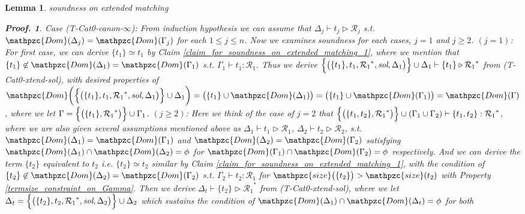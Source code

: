 \documentclass[12pt]{article}
\newtheorem{Lemma}{Lemma}[section]
\newtheorem{Proof}{Proof.}
\begin{document}
\begin{Lemma}{soundness on extended matching}
\begin{Proof}
    Case (T-Cat0-canon-$\infty$): From induction hypothesis we can assume
    that $\Delta_j \vdash t_j \triangleright \mathcal{R}_j$ s.t.
    $\mathpzc{Dom}(\Delta_j) = \mathpzc{Dom}(\Gamma_j)$ for each
    $1 \le j \le n$. Now we examines soundness for each cases,
    $j = 1$ and $j \ge 2$.
    $(j = 1)$: For first case, we can derive $\{t_1\} \simeq t_1$ by
    Claim \ref{claim_for_soundness_on_extended_matching_1}, where
    we mention that
    $\{t_1\} \not\in \mathpzc{Dom}(\Delta_1) = \mathpzc{Dom}(\Gamma_1)$
    s.t. $\Gamma_1 \vdash t_1 : \mathcal{R}_1$. Thus we derive    
    $\Bigl\{\bigl(\{t_1\}, t_1, {\mathcal{R}_1}^*, \text{\it sol}, \Delta_1
    \bigr) \Bigr\} \cup \Delta_1 \vdash \{t_1\}
    \triangleright {\mathcal{R}_1}^*$ from (T-Cat0-xtend-sol),
    with desired properties of
    $\mathpzc{Dom}\biggl(\Bigl\{\bigl(\{t_1\}, t_1, {\mathcal{R}_1}^*,
    \text{\it sol}, \Delta_1 \bigr) \Bigr\} \cup \Delta_1 \biggr) =
    \bigl(\{t_1\} \cup \mathpzc{Dom}(\Delta_1) \bigr) =
    \bigl(\{t_1\} \cup \mathpzc{Dom}(\Gamma_1) \bigr) =
    \mathpzc{Dom}(\Gamma)$, where we let
    $\Gamma = \Bigl\{\bigl(\{t_1\}, {\mathcal{R}_1}^* \bigr) \Bigr\} \cup
    \Gamma_1$.
    $(j \ge 2)$: Here we think of the case of $j = 2$ that
    $\Bigl\{\bigl(\{t_1, t_2\}, {\mathcal{R}_1}^*\bigr) \Bigr\} \cup
    (\Gamma_1 \cup \Gamma_2) \vdash \{t_1, t_2\} : {\mathcal{R}_1}^*$,
    where we are also given several assumptions mentioned above as
    $\Delta_1 \vdash t_1 \triangleright \mathcal{R}_1$,
    $\Delta_2 \vdash t_2 \triangleright \mathcal{R}_2$, s.t.
    $\mathpzc{Dom}(\Delta_1) = \mathpzc{Dom}(\Gamma_1)$ and
    $\mathpzc{Dom}(\Delta_2) = \mathpzc{Dom}(\Gamma_2)$ satisfying
    $\mathpzc{Dom}(\Delta_1) \cap \mathpzc{Dom}(\Delta_2) = \phi$ for
    $\mathpzc{Dom}(\Gamma_1) \cap \mathpzc{Dom}(\Gamma_2) = \phi$
    respectively.
    And we can derive the term $\{t_2\}$ equivalent to $t_2$ i.e.
    $\{t_2\} \simeq t_2$ similar by
    Claim \ref{claim_for_soundness_on_extended_matching_1}, with
    the condition of
    $\{t_2\} \not\in \mathpzc{Dom}(\Delta_2) = \mathpzc{Dom}(\Gamma_2)$
    s.t. $\Gamma_2 \vdash t_2 : \mathcal{R}_1$ for
    $\mathpzc{size}\bigl(\{t_2\} \bigr) > \mathpzc{size}(t_2)$ with
    Property \ref{termsize_constraint_on_Gamma}. Then we derive
    $\Delta_t \vdash \{t_2\} \triangleright {\mathcal{R}_1}^*$ from
    (T-Cat0-xtend-sol), where we let
    $\Delta_t = \Bigl\{\bigl(\{t_2\}, t_2, {\mathcal{R}_1}^*,
    \text{\it sol},\Delta_2 \bigr) \Bigr\} \cup \Delta_2$ which sustains
    the condition of
    $\mathpzc{Dom}(\Delta_1) \cap \mathpzc{Dom}(\Delta_t) = \phi$ for both

\end{Proof}
\end{Lemma}
\end{document}

